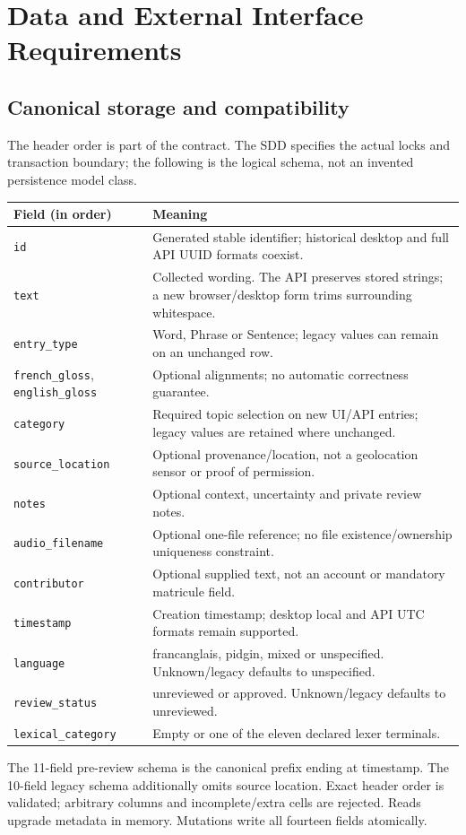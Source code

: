 \documentclass[11pt,a4paper]{article}
\begin{document}
\section{Data and External Interface Requirements}
\subsection{Canonical storage and compatibility}
The header order is part of the contract. The SDD specifies the actual locks
and transaction boundary; the following is the logical schema, not an
invented persistence model class.
\begin{longtable}{L{4cm}L{10.3cm}}
\toprule\textbf{Field (in order)} & \textbf{Meaning}\\\midrule\endhead
\nolinkurl{id} & Generated stable identifier; historical desktop and full API UUID formats coexist.\\
\nolinkurl{text} & Collected wording. The API preserves stored strings; a new browser/desktop form trims surrounding whitespace.\\
\nolinkurl{entry_type} & Word, Phrase or Sentence; legacy values can remain on an unchanged row.\\
\nolinkurl{french_gloss}, \nolinkurl{english_gloss} & Optional alignments; no automatic correctness guarantee.\\
\nolinkurl{category} & Required topic selection on new UI/API entries; legacy values are retained where unchanged.\\
\nolinkurl{source_location} & Optional provenance/location, not a geolocation sensor or proof of permission.\\
\nolinkurl{notes} & Optional context, uncertainty and private review notes.\\
\nolinkurl{audio_filename} & Optional one-file reference; no file existence/ownership uniqueness constraint.\\
\nolinkurl{contributor} & Optional supplied text, not an account or mandatory matricule field.\\
\nolinkurl{timestamp} & Creation timestamp; desktop local and API UTC formats remain supported.\\
\nolinkurl{language} & francanglais, pidgin, mixed or unspecified. Unknown/legacy defaults to unspecified.\\
\nolinkurl{review_status} & unreviewed or approved. Unknown/legacy defaults to unreviewed.\\
\nolinkurl{lexical_category} & Empty or one of the eleven declared lexer terminals.\\
\bottomrule\end{longtable}
The 11-field pre-review schema is the canonical prefix ending at timestamp.
The 10-field legacy schema additionally omits source location. Exact header
order is validated; arbitrary columns and incomplete/extra cells are rejected.
Reads upgrade metadata in memory. Mutations write all fourteen fields atomically.
\end{document}
